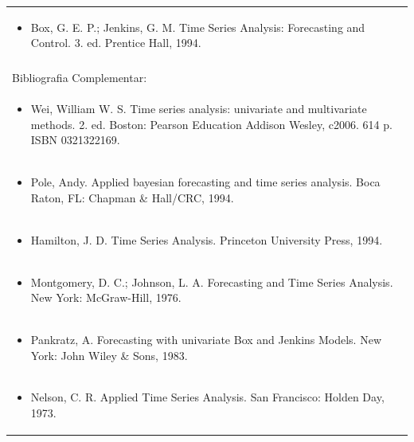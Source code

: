 \documentclass[11pt]{article}
\begin{document}
\begin{center}
\begin{longtable}{|p{4cm}|p{4cm}|p{4cm}|p{4cm}|}
\multicolumn{4}{|p{\dimexpr 16cm + 6\tabcolsep\relax}|}{\begin{itemize}\item Box, G. E. P.; Jenkins, G. M. Time Series Analysis: Forecasting and Control. 3. ed. Prentice Hall, 1994.\end{itemize}}\\
\multicolumn{4}{|p{16cm}|}{}\\
\hline
\multicolumn{4}{|p{16cm}|}{Bibliografia Complementar:}\\*
\multicolumn{4}{|p{\dimexpr 16cm + 6\tabcolsep\relax}|}{\begin{itemize}\item Wei, William W. S. Time series analysis: univariate and multivariate methods. 2. ed. Boston: Pearson Education Addison Wesley, c2006. 614 p. ISBN 0321322169.\end{itemize}}\\
\multicolumn{4}{|p{\dimexpr 16cm + 6\tabcolsep\relax}|}{\begin{itemize}\item Pole, Andy. Applied bayesian forecasting and time series analysis. Boca Raton, FL: Chapman \& Hall/CRC, 1994.\end{itemize}}\\
\multicolumn{4}{|p{\dimexpr 16cm + 6\tabcolsep\relax}|}{\begin{itemize}\item Hamilton, J. D. Time Series Analysis. Princeton University Press, 1994.\end{itemize}}\\
\multicolumn{4}{|p{\dimexpr 16cm + 6\tabcolsep\relax}|}{\begin{itemize}\item Montgomery, D. C.; Johnson, L. A. Forecasting and Time Series Analysis. New York: McGraw-Hill, 1976.\end{itemize}}\\
\multicolumn{4}{|p{\dimexpr 16cm + 6\tabcolsep\relax}|}{\begin{itemize}\item Pankratz, A. Forecasting with univariate Box and Jenkins Models. New York: John Wiley \& Sons, 1983.\end{itemize}}\\
\multicolumn{4}{|p{\dimexpr 16cm + 6\tabcolsep\relax}|}{\begin{itemize}\item Nelson, C. R. Applied Time Series Analysis. San Francisco: Holden Day, 1973.\end{itemize}}\\
\hline
\end{longtable}
\end{center}
\end{document}
